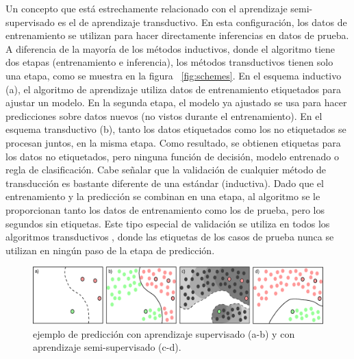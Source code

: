 
Un concepto que está estrechamente relacionado con el aprendizaje semi-supervisado es el de aprendizaje transductivo. En esta configuración, los datos de
entrenamiento se utilizan para hacer directamente inferencias en datos de prueba. A diferencia de la mayoría de los métodos inductivos, donde el algoritmo
tiene dos etapas (entrenamiento e inferencia), los métodos transductivos tienen solo una etapa, como se muestra en la figura ~\ref{fig:schemes}. En el esquema
inductivo (a), el algoritmo de aprendizaje utiliza datos de entrenamiento etiquetados para ajustar un modelo. En la segunda etapa, el modelo ya ajustado se usa
para hacer predicciones sobre datos nuevos (no vistos durante el entrenamiento). En el esquema transductivo (b), tanto los datos etiquetados como los no
etiquetados se procesan juntos, en la misma etapa. Como resultado, se obtienen etiquetas para los datos no etiquetados, pero ninguna función de decisión, modelo
entrenado o regla de clasificación. Cabe señalar que la validación de cualquier método de transducción es bastante diferente de una estándar (inductiva). Dado
que el entrenamiento y la predicción se combinan en una etapa, al algoritmo se le proporcionan tanto los datos de entrenamiento como los de prueba, pero los
segundos sin etiquetas. Este tipo especial de validación se utiliza en todos los algoritmos transductivos \citep{chapelle2006semi}, donde las etiquetas de los
casos de prueba nunca se utilizan en ningún paso de la etapa de predicción.

\begin{figure}[tpb]
	\centering
	\includegraphics[width=\textwidth]{fig/semivssuperv.eps}
	\caption[Aprendizaje semi-supervisado vs supervisado]{ejemplo de predicción con aprendizaje supervisado (a-b) y con aprendizaje semi-supervisado (c-d).}
	\label{fig:semivssuperv}
\end{figure}


